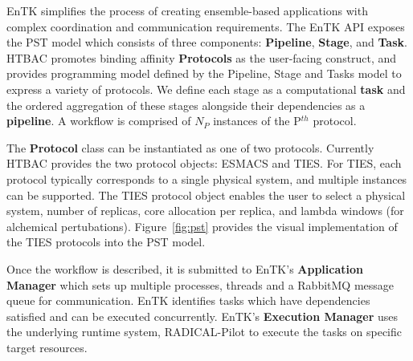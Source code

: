 
EnTK simplifies the process of creating ensemble-based applications with
complex coordination and communication requirements. The EnTK API exposes the
PST model which consists of three components: \textbf{Pipeline},
\textbf{Stage}, and \textbf{Task}. HTBAC promotes binding affinity  {\bf
Protocols} as the user-facing construct, and provides programming model
defined by the Pipeline, Stage and Tasks model to express a variety of
protocols. We define each stage as a computational \textbf{task} and the
ordered aggregation of these stages alongside their dependencies as a
\textbf{pipeline}. A workflow is comprised of $N_P$ instances of the P$^{th}$
protocol.

The \textbf{Protocol} class can be instantiated as one of two protocols.
Currently HTBAC provides the two protocol objects: ESMACS and TIES. For
TIES, each protocol typically corresponds to a single physical system, and
multiple instances can be supported. The TIES protocol object enables the user
to select a physical system, number of replicas, core allocation per replica,
and lambda windows (for alchemical pertubations). Figure~\ref{fig:pst}
provides the visual implementation of the TIES protocols into the PST model.







  Once the workflow is described, it is submitted to EnTK's
\textbf{Application Manager} which sets up multiple processes, threads and a
RabbitMQ message queue for communication.
EnTK identifies tasks which have dependencies satisfied and can be executed
concurrently. EnTK's \textbf{Execution Manager} uses the underlying runtime
system, RADICAL-Pilot to execute the tasks on specific target resources.

